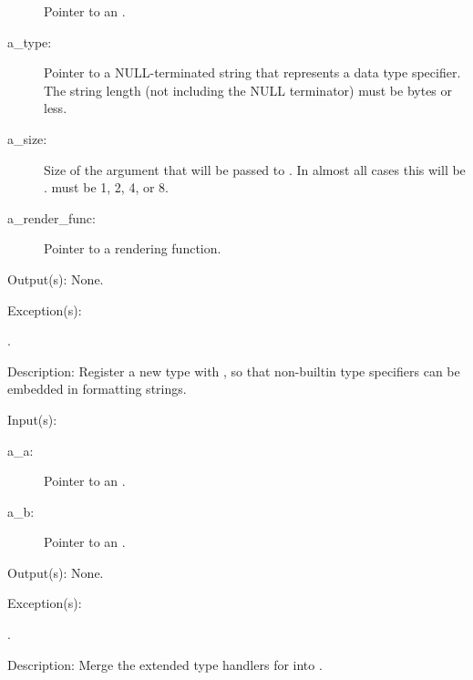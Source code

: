 \begin{capi}
\begin{capilist}
\begin{description}
			Pointer to an .
		\item[a\_type: ]
			Pointer to a NULL-terminated string that represents a
			data type specifier.  The string length (not including
			the NULL terminator) must be
			 bytes or less.
		\item[a\_size: ]
			Size of the argument that will be passed to
			.  In almost all cases this will be
			.   must be 1, 2, 4,
			or 8.
		\item[a\_render\_func: ]
			Pointer to a rendering function.
		\end{description}
	\item[Output(s): ] None.
	\item[Exception(s): ]
		\begin{description}\item[]
		\item[.]
		\end{description}
	\item[Description: ]
		Register a new type with , so that non-builtin type
		specifiers can be embedded in formatting strings.
	\end{capilist}
\label{out_merge}
	\begin{capilist}
	\item[Input(s): ]
		\begin{description}\item[]
		\item[a\_a: ]
			Pointer to an .
		\item[a\_b: ]
			Pointer to an .
		\end{description}
	\item[Output(s): ] None.
	\item[Exception(s): ]
		\begin{description}\item[]
		\item[.]
		\end{description}
	\item[Description: ]
		Merge the extended type handlers for  into
		.
	\end{capilist}
\label{out_default_fd_get}

\end{capi}
